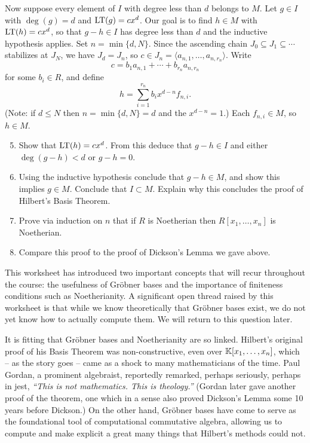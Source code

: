 \documentclass[12pt,reqno]{amsart}
\begin{document}
\begin{enumerate}[leftmargin=*]
Now suppose every element of $I$ with degree less than $d$ belongs to $M$. Let $g\in I$ with $\deg(g)=d$ and $\operatorname{LT}(g)=cx^d$. Our goal is to find $h \in M$ with $\operatorname{LT}(h) = cx^d$, so that $g - h \in I$ has degree less than $d$ and the inductive hypothesis applies. Set $n = \min\{d, N\}$. Since the ascending chain $J_0 \subseteq J_1 \subseteq \cdots$ stabilizes at $J_N$, we have $J_d = J_n$, so $c \in J_n = \langle a_{n,1}, \dots, a_{n,r_n} \rangle$. Write
\[
  c = b_1 a_{n,1} + \cdots + b_{r_n} a_{n,r_n}
\]
for some $b_i \in R$, and define
\[
  h = \sum_{i=1}^{r_n} b_i x^{d-n} f_{n,i}.
\]
(Note: if $d\leq N$ then $n=\min\{d,N\}=d$ and the $x^{d-n}=1$.) Each $f_{n,i} \in M$, so $h \in M$.
\begin{enumerate}[label=(\alph*),ref=\theenumi\alph*]
\setcounter{enumii}{4}
	\item Show that  $\operatorname{LT}(h) = cx^d$. From this deduce that $g-h \in I$ and either $\deg(g-h) < d$ or $g-h=0$.
	\item Using the inductive hypothesis conclude that $g-h \in M$, and show this implies $g \in M$. Conclude that $I \subset M$. Explain why this concludes the proof of Hilbert's Basis Theorem. 
	\item Prove via induction on $n$ that if $R$ is Noetherian then $R[x_1,\ldots,x_n]$ is Noetherian.  
	\item Compare this proof to the proof of Dickson's Lemma we gave above. 
\end{enumerate}
\end{enumerate}

\hrulefill

This worksheet has introduced two important concepts that will recur throughout the course: the usefulness of Gr\"{o}bner bases and the importance of finiteness conditions such as Noetherianity. A significant open thread raised by this worksheet is  that while we know theoretically that Gr\"{o}bner bases exist, we do not yet know how to actually compute them. We will return to this question later.

It is fitting that Gr\"{o}bner bases and Noetherianity are so linked. Hilbert's original proof of his Basis Theorem was non-constructive, even over $\mathbb{K}[x_1,\dots,x_n]$, which -- as the story goes -- came as a shock to many mathematicians of the time. Paul Gordan, a prominent algebraist, reportedly remarked, perhaps seriously, perhaps in jest, \textit{``This is not mathematics. This is theology.''} (Gordan later gave another proof of the theorem, one which in a sense also proved Dickson's Lemma some 10 years before Dickson.) On the other hand, Gr\"{o}bner bases have come to serve as the foundational tool of computational commutative algebra, allowing us to compute and make explicit a great many things that Hilbert's methods could not.

\hrulefill
\hrulefill
\end{document}
